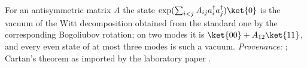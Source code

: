 For an antisymmetric matrix $A$ the state $\exp(\sum_{i<j}A_{ij}a^{\dagger}_{i}a^{\dagger}_{j})\ket{0}$ is the vacuum of the Witt decomposition obtained from the standard one by the corresponding Bogoliubov rotation; on two modes it is $\ket{00} + A_{12}\ket{11}$, and every even state of at most three modes is such a vacuum. \emph{Provenance:} \cite{Thouless1960}; Cartan's theorem as imported by the laboratory paper \cite[Fact~2.10]{ButlerT16}.
